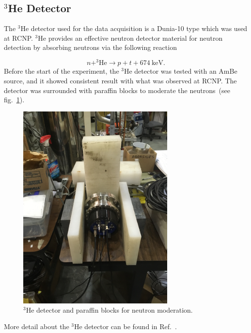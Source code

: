 \subsection{$^3$He Detector}

The $^3$He detector used for the data acquisition is a Dunia-10 type
which was used at RCNP. $^3$He provides an effective neutron
detector material for neutron detection by absorbing neutrons via the
following reaction

\begin{equation}
  \label{eqn:he3}
n + ^3\mathrm{He} \rightarrow p + t + 674~\mathrm{keV}.
\end{equation}
Before the start of the experiment, the $^3$He detector was tested
with an AmBe source, and it showed consistent result with what was
observed at RCNP. The detector was surrounded with paraffin blocks to
moderate the neutrons~(see fig.~\ref{fig:he3detector}).

\begin{figure}[h!]
  \centering
  \includegraphics[width=0.7\textwidth, angle = 270]{he3detector.png}
  \caption{$^3$He detector and paraffin blocks for neutron
    moderation.}
  \label{fig:he3detector}
\end{figure}
More detail about the $^3$He detector can be found in
Ref.~\cite{matsumiya_thesis}.

